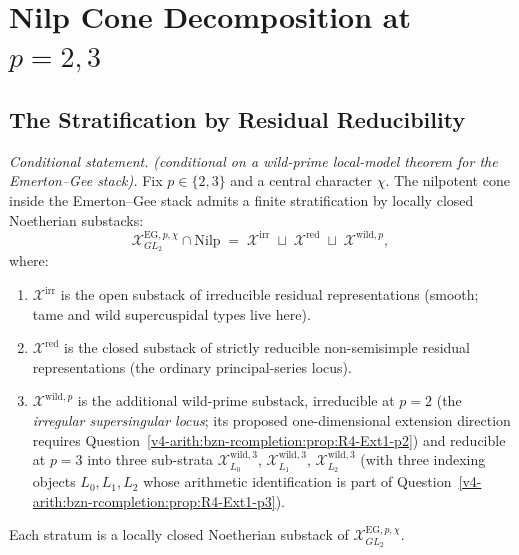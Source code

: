\section{Nilp Cone Decomposition at \(p=2,3\)}
\label{v4-arith:w5-g:f1a3-C:nilp-decomposition}

\subsection{The Stratification by Residual Reducibility}

\begin{proposition}
\label{v4-arith:w5-g:f1a3-C:prop:nilp-stratification}
\emph{Conditional statement.} \emph{(conditional on a wild-prime
local-model theorem for the Emerton--Gee stack).} Fix \(p\in\{2,3\}\)
and a central character
\(\chi\). The nilpotent cone inside the Emerton--Gee stack admits a
finite stratification by locally closed Noetherian substacks:
\begin{equation}
\label{v4-arith:w5-g:f1a3-C:eq:stratification}
\mathcal{X}^{\mathrm{EG},p,\chi}_{GL_{2}}\cap\mathrm{Nilp}
\;=\;\mathcal{X}^{\mathrm{irr}}\;\sqcup\;\mathcal{X}^{\mathrm{red}}\;\sqcup\;\mathcal{X}^{\mathrm{wild},p},
\end{equation}
where:
\begin{enumerate}
\item \(\mathcal{X}^{\mathrm{irr}}\) is the open substack of irreducible
residual representations (smooth; tame and wild supercuspidal types
live here).
\item \(\mathcal{X}^{\mathrm{red}}\) is the closed substack of strictly
reducible non-semisimple residual representations (the ordinary
principal-series locus).
\item \(\mathcal{X}^{\mathrm{wild},p}\) is the additional wild-prime
substack, irreducible at \(p=2\) (the \emph{irregular supersingular
locus}; its proposed one-dimensional extension direction requires
Question~\ref{v4-arith:bzn-rcompletion:prop:R4-Ext1-p2}) and reducible at
\(p=3\) into three sub-strata \(\mathcal{X}^{\mathrm{wild},3}_{L_{0}}\),
\(\mathcal{X}^{\mathrm{wild},3}_{L_{1}}\), \(\mathcal{X}^{\mathrm{wild},3}_{L_{2}}\)
(with three indexing objects \(L_0,L_1,L_2\) whose arithmetic
identification is part of
Question~\ref{v4-arith:bzn-rcompletion:prop:R4-Ext1-p3}).
\end{enumerate}
Each stratum is a locally closed Noetherian substack of
\(\mathcal{X}^{\mathrm{EG},p,\chi}_{GL_{2}}\).
\end{proposition}

